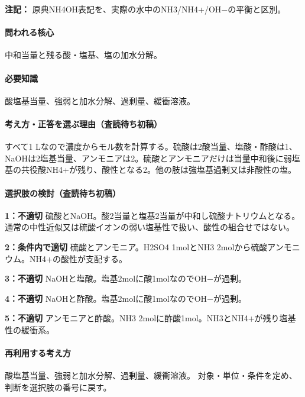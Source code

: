\noindent\textbf{注記：} 原典NH4OH表記を、実際の水中のNH3/NH4+/OH−の平衡と区別。\par

\paragraph{問われる核心} 中和当量と残る酸・塩基、塩の加水分解。

\paragraph{必要知識} 酸塩基当量、強弱と加水分解、過剰量、緩衝溶液。

\paragraph{考え方・正答を選ぶ理由（査読待ち初稿）} すべて1 Lなので濃度からモル数を計算する。硫酸は2酸当量、塩酸・酢酸は1、NaOHは2塩基当量、アンモニアは2。硫酸とアンモニアだけは当量中和後に弱塩基の共役酸NH4+が残り、酸性となる2。他の肢は強塩基過剰又は非酸性の塩。

\paragraph{選択肢の検討（査読待ち初稿）}\mbox{}\par

\noindent\textbf{1：不適切} 硫酸とNaOH。酸2当量と塩基2当量が中和し硫酸ナトリウムとなる。通常の中性近似又は硫酸イオンの弱い塩基性で扱い、酸性の組合せではない。\par

\noindent\textbf{2：条件内で適切} 硫酸とアンモニア。H2SO4 1molとNH3 2molから硫酸アンモニウム。NH4+の酸性が支配する。\par

\noindent\textbf{3：不適切} NaOHと塩酸。塩基2molに酸1molなのでOH−が過剰。\par

\noindent\textbf{4：不適切} NaOHと酢酸。塩基2molに酸1molなのでOH−が過剰。\par

\noindent\textbf{5：不適切} アンモニアと酢酸。NH3 2molに酢酸1mol。NH3とNH4+が残り塩基性の緩衝系。\par

\paragraph{再利用する考え方} 酸塩基当量、強弱と加水分解、過剰量、緩衝溶液。 対象・単位・条件を定め、判断を選択肢の番号に戻す。

